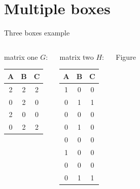 \documentclass{beamer}
\begin{document}
\section{Multiple boxes}
\begin{frame}{Three boxes example}
  \begin{columns}[t]
    \begin{block}{matrix one}
      $G\colon$
      \begin{tabular}{ccc}
        A & B & C \\\hline
        2 & 2 & 2 \\
        0 & 2 & 0 \\
        2 & 0 & 0 \\
        0 & 2 & 2 
      \end{tabular}
    \end{block}

    \begin{alertblock}{matrix two}
      $H\colon$
      \begin{tabular}{ccc}
        A & B & C \\\hline
        1 & 0 & 0 \\
        0 & 1 & 1 \\
        0 & 0 & 0 \\
        0 & 1 & 0 \\
        0 & 0 & 0 \\
        1 & 0 & 0 \\
        0 & 0 & 0 \\
        0 & 1 & 1 
      \end{tabular}
    \end{alertblock}

    \begin{block}{Figure}
      \begin{center}
      \end{center}
    \end{block}
  \end{columns}
\end{frame}
\end{document}
